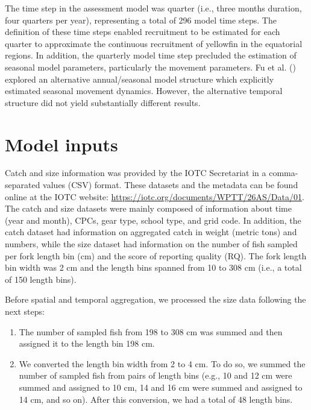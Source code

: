 \documentclass[
]{scrartcl}
\providecommand{\tightlist}{%
  \setlength{\itemsep}{0pt}\setlength{\parskip}{0pt}}\usepackage{longtable,booktabs,array}
\begin{document}
The time step in the assessment model was quarter (i.e., three months
duration, four quarters per year), representing a total of 296 model
time steps. The definition of these time steps enabled recruitment to be
estimated for each quarter to approximate the continuous recruitment of
yellowfin in the equatorial regions. In addition, the quarterly model
time step precluded the estimation of seasonal model parameters,
particularly the movement parameters. Fu et al.
() explored an
alternative annual/seasonal model structure which explicitly estimated
seasonal movement dynamics. However, the alternative temporal structure
did not yield substantially different results.

\section{Model inputs}\label{model-inputs}

Catch and size information was provided by the IOTC Secretariat in a
comma-separated values (CSV) format. These datasets and the metadata can
be found online at the IOTC website:
\url{https://iotc.org/documents/WPTT/26AS/Data/01}. The catch and size
datasets were mainly composed of information about time (year and
month), CPCs, gear type, school type, and grid code. In addition, the
catch dataset had information on aggregated catch in weight (metric
tons) and numbers, while the size dataset had information on the number
of fish sampled per fork length bin (cm) and the score of reporting
quality (RQ). The fork length bin width was 2 cm and the length bins
spanned from 10 to 308 cm (i.e., a total of 150 length bins).

Before spatial and temporal aggregation, we processed the size data
following the next steps:

\begin{enumerate}
\def\labelenumi{\arabic{enumi}.}
\tightlist
\item
  The number of sampled fish from 198 to 308 cm was summed and then
  assigned it to the length bin 198 cm.
\item
  We converted the length bin width from 2 to 4 cm. To do so, we summed
  the number of sampled fish from pairs of length bins (e.g., 10 and 12
  cm were summed and assigned to 10 cm, 14 and 16 cm were summed and
  assigned to 14 cm, and so on). After this conversion, we had a total
  of 48 length bins.
\end{enumerate}
\end{document}
